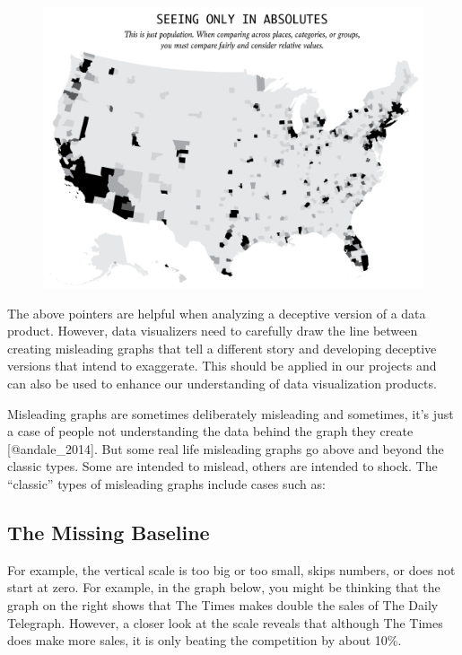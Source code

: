 \documentclass[]{book}
\theoremstyle{definition}
\theoremstyle{definition}
\theoremstyle{definition}
\theoremstyle{remark}
\begin{document}
\begin{figure}
\centering
\includegraphics{images/Maps1.png}
\caption{}
\end{figure}

The above pointers are helpful when analyzing a deceptive version of a
data product. However, data visualizers need to carefully draw the line
between creating misleading graphs that tell a different story and
developing deceptive versions that intend to exaggerate. This should be
applied in our projects and can also be used to enhance our
understanding of data visualization products.

Misleading graphs are sometimes deliberately misleading and sometimes,
it's just a case of people not understanding the data behind the graph
they create {[}@andale\_2014{]}. But some real life misleading graphs go
above and beyond the classic types. Some are intended to mislead, others
are intended to shock. The ``classic'' types of misleading graphs
include cases such as:

\subsection{The Missing Baseline}\label{the-missing-baseline}

For example, the vertical scale is too big or too small, skips numbers,
or does not start at zero. For example, in the graph below, you might be
thinking that the graph on the right shows that The Times makes double
the sales of The Daily Telegraph. However, a closer look at the scale
reveals that although The Times does make more sales, it is only beating
the competition by about 10\%.
\end{document}

